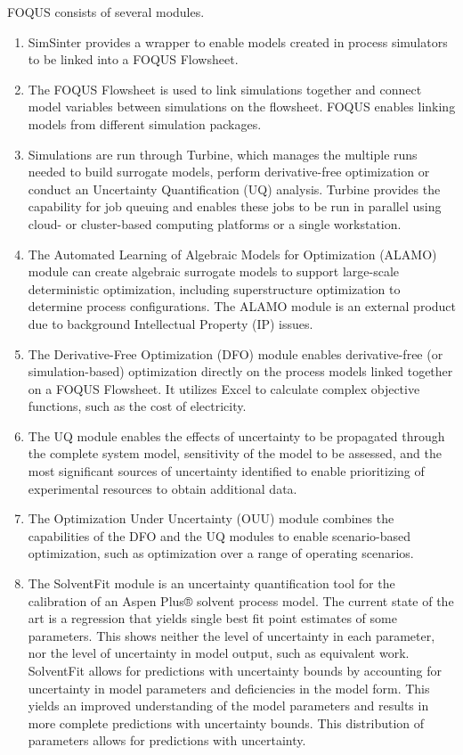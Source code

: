 {	FOQUS consists of several modules.
	\begin{enumerate}
		\item SimSinter provides a wrapper to enable models created in process simulators to be linked into a FOQUS Flowsheet.
		\item The FOQUS Flowsheet is used to link simulations together and connect model variables between simulations on the flowsheet. FOQUS enables linking models from different simulation packages.
		\item Simulations are run through Turbine, which manages the multiple runs needed to build surrogate models, perform derivative-free optimization or conduct an Uncertainty Quantification (UQ) analysis. Turbine provides the capability for job queuing and enables these jobs to be run in parallel using cloud- or cluster-based computing platforms or a single workstation.
		\item The Automated Learning of Algebraic Models for Optimization (ALAMO) module can create algebraic surrogate models to support large-scale deterministic optimization, including superstructure optimization to determine process configurations. The ALAMO module is an external product due to background Intellectual Property (IP) issues.
		\item The Derivative-Free Optimization (DFO) module enables derivative-free (or simulation-based) optimization directly on the process models linked together on a FOQUS Flowsheet. It utilizes Excel to calculate complex objective functions, such as the cost of electricity.
		\item The UQ module enables the effects of uncertainty to be propagated through the complete system model, sensitivity of the model to be assessed, and the most significant sources of uncertainty identified to enable prioritizing of experimental resources to obtain additional data.
		\item The Optimization Under Uncertainty (OUU) module combines the capabilities of the DFO and the UQ modules to enable scenario-based optimization, such as optimization over a range of operating scenarios.
		\item The SolventFit module is an uncertainty quantification tool for the calibration of an Aspen Plus® solvent process model. The current state of the art is a regression that yields single best fit point estimates of some parameters. This shows neither the level of uncertainty in each parameter, nor the level of uncertainty in model output, such as equivalent work. SolventFit allows for predictions with uncertainty bounds by accounting for uncertainty in model parameters and deficiencies in the model form. This yields an improved understanding of the model parameters and results in more complete predictions with uncertainty bounds. This distribution of parameters allows for predictions with uncertainty.
	\end{enumerate}
}

